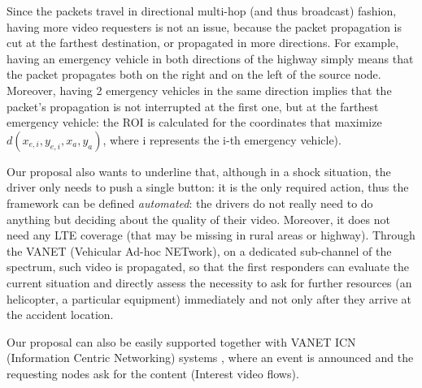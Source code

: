 \documentclass{acm_proc_article-sp}
\begin{document}
Since the packets travel in directional multi-hop (and thus broadcast) fashion, having more video requesters is not an issue, because the packet propagation is cut at the farthest destination, or propagated in more directions. For example, having an emergency vehicle in both directions of the highway simply means that the packet propagates both on the right and on the left of the source node. Moreover, having 2 emergency vehicles in the same direction implies that the packet's propagation is not interrupted at the first one, but at the farthest emergency vehicle: the ROI is calculated for the coordinates that maximize $d(x_{e,i},y_{e,i},x_{a},y_{a})$, where i represents the i-th emergency vehicle).

Our proposal also wants to underline that, although in a shock situation, the driver only needs to push a single button: it is the only required action, thus the framework can be defined \textit{ automated}: the drivers do not really need to do anything but deciding about the quality of their video. Moreover, it does not need any LTE coverage (that may be missing in rural areas or highway). Through the VANET (Vehicular Ad-hoc NETwork), on a dedicated sub-channel of the spectrum, such video is propagated, so that the first responders can evaluate the current situation and directly assess the necessity to ask for further resources (an helicopter, a particular equipment) immediately and not only after they arrive at the accident location.

Our proposal can also be easily supported together with VANET ICN (Information Centric Networking) systems \cite{QualityEstimator}, where an event is announced and the requesting nodes ask for the content (Interest video flows).
\end{document}
